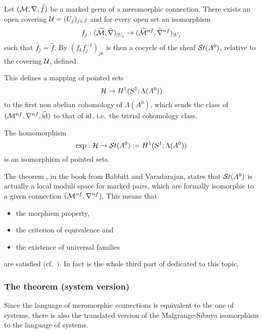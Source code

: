 Let $(\mathcal{M},\nabla,\widehat f)$ be a marked germ of a  meromorphic connection.
There exists an open covering $\mathcal{U}=(U_j)_{j\in J}$ and for every open set an
isomorphism
\[
  f_j:(\widetilde{\mathcal{M}},\widetilde\nabla)_{|U_j}
  \to(\widetilde{\mathcal{M}}^{nf},\widetilde\nabla^{nf})_{|U_j}
\]
such that $\hat f_j=\hat f$. By $(f_kf_j^{-1})_{jk}$ is then a cocycle of the
sheaf $\mathcal{S}{}t(A^0)$, relative to the covering $\mathcal{U}$, defined.
\begin{comment}
  For other lifts $f_j'$ of $\hat f$ on $W_j$, $(f_j'f_j^{-1})$ is a
  $0$-cochain of $\Sto(A^0)$ relative to $\cU$. Thus the associated cochians to
  $(f_j)$ and $(f_j')$ are equivalent. One can also check that, if
  $(\cM,\nabla,\hat f)$ and $(\cM',\nabla',\hat f')$ are isomorphic, the
  corresponding cocycles define the same cohomology class.
\end{comment}
This defines a mapping of pointed sets
\[
  \mathcal{H}\to H^1(S^1;\Lambda(A^0))
\]
to the first non abelian cohomology of $\Lambda(A^0)$, which sends the class of
$(\mathcal{M}^{nf},\nabla^{nf},\widehat{\operatorname{id}})$ to that of $\operatorname{id}$, i.e.\ the trivial cohomology
class.

\begin{tthm} \label{thm:mainThm1MeromVersion}
  The homomorphism
  \[
    \exp:\mathcal{H}\to\mathcal{S}{}t(A^0):=H^1(S^1;\Lambda(A^0))
  \]
  is an isomorphism of pointed sets.
\end{tthm}
\begin{rem}
  The theorem \cite[Thm.III.1.1.2]{babbitt1989local}, in the book from
  Babbitt and Varadarajan, states that $\mathcal{S}{}t(A^0)$
  is actually a local moduli space for marked pairs, which are formally
  isomorphic to a given connection $(\mathcal{M}^{nf},\nabla^{nf})$. This means that
  \begin{itemize}
    \item the morphism property,
    \item the criterion of equivalence and
    \item the existence of universal families
  \end{itemize}
  are satisfied (cf.\ \cite[169]{babbitt1989local}).
  In fact is the whole third part of \cite{babbitt1989local} dedicated to this
  topic.
\end{rem}

\subsubsection{The theorem (system version)}
Since the language of meromorphic connections is equivalent to the one of
systems, there is also the translated version of the Malgrange-Sibuya
isomorphism to the language of systems.

